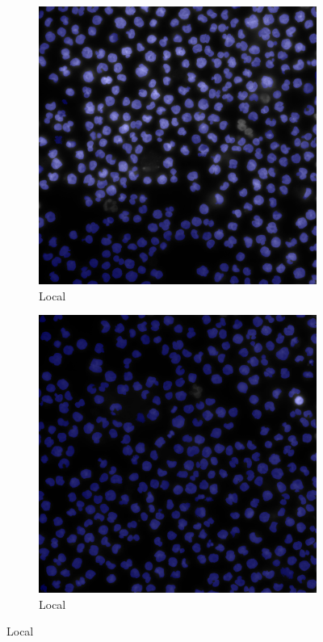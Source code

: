 \begin{figure}[ht] 
    \begin{subfigure}[b]{0.5\linewidth}
      \centering
      \includegraphics[width=0.75\linewidth]{bilder/difficult-lightning/gradient_local.png} 
      \caption{Local} 
      \label{fig7:a} 
      \vspace{4ex}
    \end{subfigure}%
    \begin{subfigure}[b]{0.5\linewidth}
      \centering
      \includegraphics[width=0.75\linewidth]{bilder/difficult-lightning/point_local.png} 
      \caption{Local} 
      \label{fig7:b} 
      \vspace{4ex}
    \end{subfigure} 

\end{figure}
